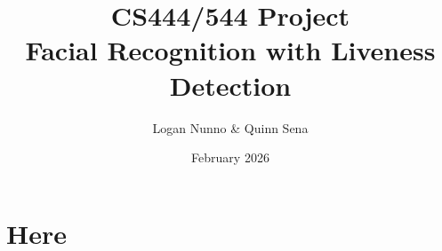 \documentclass{article}
\title{CS444/544 Project \\ Facial Recognition with Liveness Detection}
\author{Logan Nunno \& Quinn Sena}
\date{February 2026}
\begin{document}
\maketitle

\section{Here}
\end{document}
